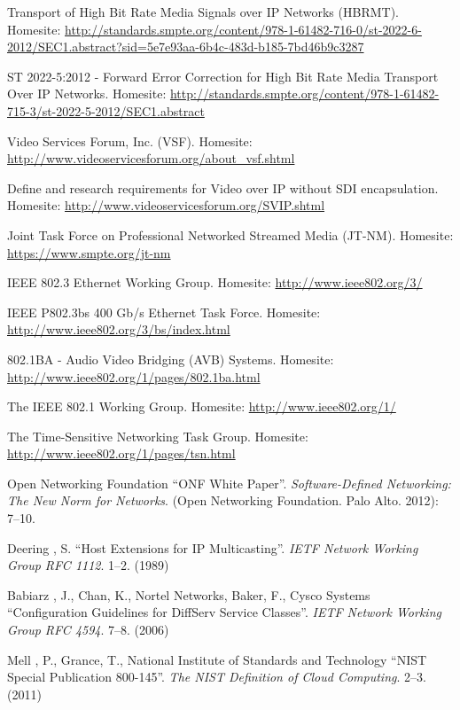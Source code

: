 \documentclass[english,final]{setup/eetac_tfc_pfc}
\begin{document}
\begin{thebibliography}{2}
Transport of High Bit Rate Media Signals over IP Networks (HBRMT). Homesite: \url{http://standards.smpte.org/content/978-1-61482-716-0/st-2022-6-2012/SEC1.abstract?sid=5e7e93aa-6b4c-483d-b185-7bd46b9c3287}

ST 2022-5:2012 - Forward Error Correction for High Bit Rate Media Transport Over IP Networks. Homesite: \url{http://standards.smpte.org/content/978-1-61482-715-3/st-2022-5-2012/SEC1.abstract}

Video Services Forum, Inc. (VSF). Homesite: \url{http://www.videoservicesforum.org/about_vsf.shtml}

Define and research requirements for Video over IP without SDI encapsulation. Homesite: \url{http://www.videoservicesforum.org/SVIP.shtml}

Joint Task Force on Professional Networked Streamed Media (JT-NM). Homesite: \url{https://www.smpte.org/jt-nm}

IEEE 802.3 Ethernet Working Group. Homesite: \url{http://www.ieee802.org/3/}

IEEE P802.3bs 400 Gb/s Ethernet Task Force. Homesite: \url{http://www.ieee802.org/3/bs/index.html}

802.1BA - Audio Video Bridging (AVB) Systems. Homesite: \url{http://www.ieee802.org/1/pages/802.1ba.html}

The IEEE 802.1 Working Group. Homesite: \url{http://www.ieee802.org/1/}

The Time-Sensitive Networking Task Group. Homesite: \url{http://www.ieee802.org/1/pages/tsn.html}

Open Networking Foundation 
``ONF White Paper''. {\it Software-Defined Networking: The New Norm for Networks}.
(Open Networking Foundation. Palo Alto. 2012): 7--10.

Deering , S.
``Host Extensions for IP Multicasting''. {\it IETF Network Working Group RFC 1112}.
1--2. (1989) 

Babiarz , J., Chan, K., Nortel Networks, Baker, F., Cysco Systems
``Configuration Guidelines for DiffServ Service Classes''. {\it IETF Network Working Group RFC 4594}.
7--8. (2006) 

Mell , P., Grance, T., National Institute of Standards and Technology
``NIST Special Publication 800-145''. {\it The NIST Definition of Cloud Computing}.
2--3. (2011) 


\end{thebibliography}
\end{document}
